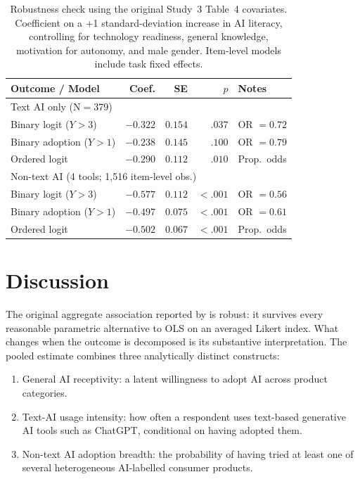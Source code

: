 \documentclass[11pt]{article}
\begin{document}
\begin{table}[t]
  \centering
  \caption{Robustness check using the original Study~3 Table~4 covariates.
    Coefficient on a +1 standard-deviation increase in AI literacy, controlling
    for technology readiness, general knowledge, motivation for autonomy, and
    male gender. Item-level models include task fixed effects.}
  \label{tab:robustness}
  \begin{tabular}{lrrrl}
    \toprule
    \textbf{Outcome / Model} & \textbf{Coef.} & \textbf{SE} & \textbf{$p$} & \textbf{Notes} \\
    \midrule
    \multicolumn{5}{l}{Text AI only (N$=$379)} \\
    \quad Binary logit ($Y > 3$)           & $-0.322$ & $0.154$ & $.037$ & OR $= 0.72$ \\
    \quad Binary adoption ($Y > 1$)        & $-0.238$ & $0.145$ & $.100$ & OR $= 0.79$ \\
    \quad Ordered logit                    & $-0.290$ & $0.112$ & $.010$ & Prop.\ odds \\
    \midrule
    \multicolumn{5}{l}{Non-text AI (4 tools; 1{,}516 item-level obs.)} \\
    \quad Binary logit ($Y > 3$)           & $-0.577$ & $0.112$ & $< .001$ & OR $= 0.56$ \\
    \quad Binary adoption ($Y > 1$)        & $-0.497$ & $0.075$ & $< .001$ & OR $= 0.61$ \\
    \quad Ordered logit                    & $-0.502$ & $0.067$ & $< .001$ & Prop.\ odds \\
    \bottomrule
  \end{tabular}
\end{table}

\section{Discussion}

The original aggregate association reported by \citet{tully2025lower} is
robust: it survives every reasonable parametric alternative to OLS on an
averaged Likert index. What changes when the outcome is decomposed is its
substantive interpretation. The pooled estimate combines three
analytically distinct constructs:

\begin{enumerate}
  \item General AI receptivity: a latent willingness to adopt AI
    across product categories.
  \item Text-AI usage intensity: how often a respondent uses
    text-based generative AI tools such as ChatGPT, conditional on having
    adopted them.
  \item Non-text AI adoption breadth: the probability of having
    tried at least one of several heterogeneous AI-labelled consumer
    products.
\end{enumerate}
\end{document}
